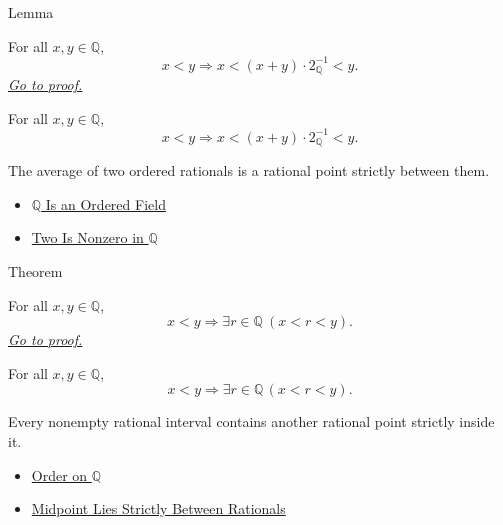 \begin{lemmabox}{Lemma}
\begin{lemma}
\label{lem:midpoint-between-q}
For all $x,y\in\mathbb{Q}$,
\[
x<y
\Longrightarrow
x< (x+y)\cdot 2_{\mathbb{Q}}^{-1}<y.
\]
\hyperref[prf:midpoint-between-q]{\textit{Go to proof.}}
\end{lemma}
\end{lemmabox}

\begin{remark*}
For all $x,y\in\mathbb{Q}$,
\[
x<y
\Longrightarrow
x<(x+y)\cdot 2_{\mathbb{Q}}^{-1}<y.
\]
\end{remark*}

\begin{remark*}[Interpretation]
The average of two ordered rationals is a rational point strictly between
them.
\end{remark*}

\begin{dependencies}
\begin{itemize}
  
\item \hyperref[thm:q-is-an-ordered-field]{$\mathbb{Q}$ Is an Ordered Field}
  \item \hyperref[lem:two-nonzero-in-q]{Two Is Nonzero in $\mathbb{Q}$}
\end{itemize}
\end{dependencies}

\begin{theorembox}{Theorem}
\begin{theorem}
\label{thm:density-of-q}
For all $x,y\in\mathbb{Q}$,
\[
x<y
\Longrightarrow
\exists r\in\mathbb{Q}\ (x<r<y).
\]
\hyperref[prf:density-of-q]{\textit{Go to proof.}}
\end{theorem}
\end{theorembox}

\begin{remark*}
For all $x,y\in\mathbb{Q}$,
\[
x<y
\Longrightarrow
\exists r\in\mathbb{Q}\,(x<r<y).
\]
\end{remark*}

\begin{remark*}[Interpretation]
Every nonempty rational interval contains another rational point strictly
inside it.
\end{remark*}

\begin{dependencies}
\begin{itemize}
  \item \hyperref[def:order-on-q]{Order on $\mathbb{Q}$}
  \item \hyperref[lem:midpoint-between-q]{Midpoint Lies Strictly Between Rationals}
\end{itemize}
\end{dependencies}

